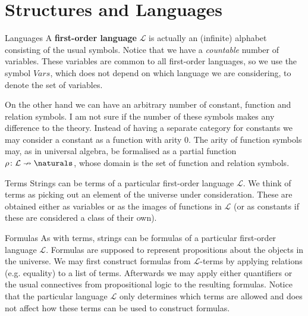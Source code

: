 \documentclass[article, a4paper, 11pt, oneside]{memoir}
\title{\doctitle}
\author{\docauthor}
\numberwithin{equation}{chapter}
\newcommand{\calL}{\mathcal{L}}
\newcommand{\keyword}[1]{{\bfseries #1}}
\theoremstyle{nonumberplain}
\begin{document}
\maketitle

\chapter{Structures and Languages}

\newcommand{\limplies}{\vDash}
\newcommand{\valid}{\vDash}
\newcommand{\lcond}{\rightarrow}
\let\oldmodels\models
\renewcommand{\models}{\vDash}
\newcommand{\sats}[1]{\vDash_{#1}}
\newcommand{\notsats}[1]{\not\vDash_{#1}}
\newcommand{\vars}{\mathit{Vars}}

\begin{notelist}
    \item[Languages]
    A \keyword{first-order language} $\calL$ is actually an (infinite) alphabet consisting of the usual symbols. Notice that we have a \emph{countable} number of variables. These variables are common to all first-order languages, so we use the symbol $\vars$, which does not depend on which language we are considering, to denote the set of variables.
    
    On the other hand we can have an arbitrary number of constant, function and relation symbols. I am not sure if the number of these symbols makes any difference to the theory. Instead of having a separate category for constants we may consider a constant as a function with arity $0$. The arity of function symbols may, as in universal algebra, be formalised as a partial function $\rho \colon \calL \nrightarrow \naturals$, whose domain is the set of function and relation symbols.

    \item[Terms]
    Strings can be terms of a particular first-order language $\calL$. We think of terms as picking out an element of the universe under consideration. These are obtained either as variables or as the images of functions in $\calL$ (or as constants if these are considered a class of their own).
    
    \item[Formulas]
    As with terms, strings can be formulas of a particular first-order language $\calL$. Formulas are supposed to represent propositions about the objects in the universe. We may first construct formulas from $\calL$-terms by applying relations (e.g. equality) to a list of terms. Afterwards we may apply either quantifiers or the usual connectives from propositional logic to the resulting formulas. Notice that the particular language $\calL$ only determines which terms are allowed and does not affect how these terms can be used to construct formulas.
    

\end{notelist}
\end{document}
